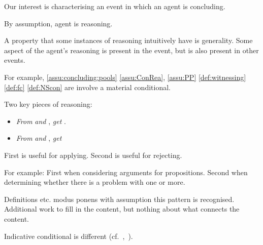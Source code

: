 \begin{note}
  Our interest is characterising an event in which an agent is concluding.

  By assumption, agent is reasoning.

  A property that some instances of reasoning intuitively have is generality.
  Some aspect of the agent's reasoning is present in the event, but is also present in other events.

  For example, \autoref{assu:concluding:pools} \autoref{assu:ConRea}, \autoref{assu:PP} \autoref{def:witnessing} \autoref{def:fc} \autoref{def:NScon} are involve a material conditional.

  Two key pieces of reasoning:

  \begin{itemize}
  \item
    \emph{From}  \emph{and} , \emph{get} .
  \item
    \emph{From}  \emph{and} , \emph{get} 
  \end{itemize}

  First is useful for applying.
  Second is useful for rejecting.

  For example:
  First when considering arguments for propositions.
  Second when determining whether there is a problem with one or more.

  Definitions etc. modus ponens with assumption this pattern is recognised.
  Additional work to fill in the content, but nothing about what connects the content.

  Indicative conditional is different (cf.~\cite{McGee:1985tz},~\cite{Kolodny:2010aa}).
\end{note}

